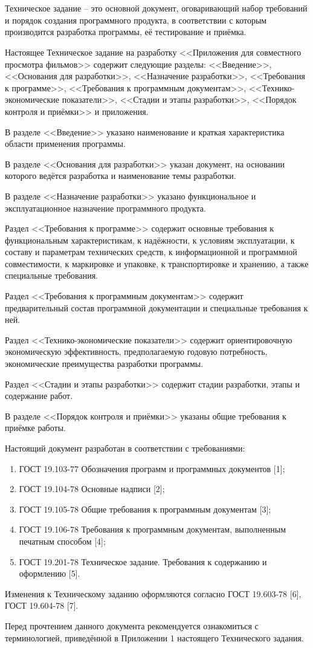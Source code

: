 \section*{}

Техническое задание -- это основной документ, оговаривающий набор требований и порядок создания программного продукта,
в соответствии с которым производится разработка программы, её тестирование и приёмка.

Настоящее Техническое задание на разработку <<Приложения для совместного просмотра фильмов>> содержит следующие разделы:
<<Введение>>, <<Основания для разработки>>, <<Назначение разработки>>, <<Требования к программе>>, <<Требования к программным документам>>,
<<Технико-экономические показатели>>, <<Стадии и этапы разработки>>, <<Порядок контроля и приёмки>> и приложения.

В разделе <<Введение>> указано наименование и краткая характеристика области применения программы.

В разделе <<Основания для разработки>> указан документ, на основании которого ведётся разработка и наименование темы разработки.

В разделе <<Назначение разработки>> указано функциональное и эксплуатационное назначение программного продукта.

Раздел <<Требования к программе>> содержит основные требования к функциональным характеристикам, к надёжности, к условиям
эксплуатации, к составу и параметрам технических средств, к информационной и программной совместимости, к маркировке и
упаковке, к транспортировке и хранению, а также специальные требования.

Раздел <<Требования к программным документам>> содержит предварительный состав программной документации и специальные требования к ней.

Раздел <<Технико-экономические показатели>> содержит ориентировочную экономическую эффективность,
предполагаемую годовую потребность, экономические преимущества разработки программы.

Раздел <<Стадии и этапы разработки>> содержит стадии разработки, этапы и содержание работ.

В разделе <<Порядок контроля и приёмки>> указаны общие требования к приёмке работы.

Настоящий документ разработан в соответствии с требованиями:
\begin{enumerate}
    \item ГОСТ 19.103-77 Обозначения программ и программных документов [1];
    \item ГОСТ 19.104-78 Основные надписи [2];
    \item ГОСТ 19.105-78 Общие требования к программным документам [3];
    \item ГОСТ 19.106-78 Требования к программным документам, выполненным печатным способом [4];
    \item ГОСТ 19.201-78 Техническое задание.
    Требования к содержанию и оформлению [5].
\end{enumerate}

Изменения к Техническому заданию оформляются согласно ГОСТ 19.603-78 [6], ГОСТ 19.604-78 [7].

Перед прочтением данного документа рекомендуется ознакомиться с терминологией, приведённой в Приложении 1 настоящего
Технического задания.